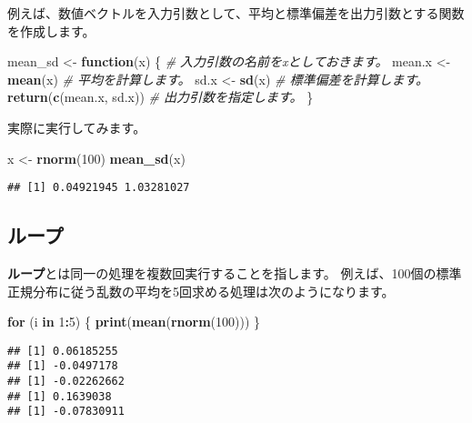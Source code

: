 \documentclass[]{bxjsarticle}
\newenvironment{Shaded}{\begin{snugshade}}{\end{snugshade}}
\newcommand{\CommentTok}[1]{\textcolor[rgb]{0.56,0.35,0.01}{\textit{#1}}}
\newcommand{\ControlFlowTok}[1]{\textcolor[rgb]{0.13,0.29,0.53}{\textbf{#1}}}
\newcommand{\DecValTok}[1]{\textcolor[rgb]{0.00,0.00,0.81}{#1}}
\newcommand{\KeywordTok}[1]{\textcolor[rgb]{0.13,0.29,0.53}{\textbf{#1}}}
\newcommand{\NormalTok}[1]{#1}
\newcommand{\OperatorTok}[1]{\textcolor[rgb]{0.81,0.36,0.00}{\textbf{#1}}}
\newcommand{\StringTok}[1]{\textcolor[rgb]{0.31,0.60,0.02}{#1}}
\begin{document}
例えば、数値ベクトルを入力引数として、平均と標準偏差を出力引数とする関数を作成します。

\begin{Shaded}
\begin{Highlighting}[]
\NormalTok{mean_sd <-}\StringTok{ }\ControlFlowTok{function}\NormalTok{(x) \{ }\CommentTok{# 入力引数の名前をxとしておきます。}
\NormalTok{  mean.x <-}\StringTok{ }\KeywordTok{mean}\NormalTok{(x) }\CommentTok{# 平均を計算します。}
\NormalTok{  sd.x <-}\StringTok{ }\KeywordTok{sd}\NormalTok{(x) }\CommentTok{# 標準偏差を計算します。}
  \KeywordTok{return}\NormalTok{(}\KeywordTok{c}\NormalTok{(mean.x, sd.x)) }\CommentTok{# 出力引数を指定します。}
\NormalTok{\}}
\end{Highlighting}
\end{Shaded}

実際に実行してみます。

\begin{Shaded}
\begin{Highlighting}[]
\NormalTok{x <-}\StringTok{ }\KeywordTok{rnorm}\NormalTok{(}\DecValTok{100}\NormalTok{)}
\KeywordTok{mean_sd}\NormalTok{(x)}
\end{Highlighting}
\end{Shaded}

\begin{verbatim}
## [1] 0.04921945 1.03281027
\end{verbatim}

\hypertarget{ux30ebux30fcux30d7}{%
\subsection{ループ}\label{ux30ebux30fcux30d7}}

\textbf{ループ}とは同一の処理を複数回実行することを指します。
例えば、100個の標準正規分布に従う乱数の平均を5回求める処理は次のようになります。

\begin{Shaded}
\begin{Highlighting}[]
\ControlFlowTok{for}\NormalTok{ (i }\ControlFlowTok{in} \DecValTok{1}\OperatorTok{:}\DecValTok{5}\NormalTok{) \{}
  \KeywordTok{print}\NormalTok{(}\KeywordTok{mean}\NormalTok{(}\KeywordTok{rnorm}\NormalTok{(}\DecValTok{100}\NormalTok{)))}
\NormalTok{\}}
\end{Highlighting}
\end{Shaded}

\begin{verbatim}
## [1] 0.06185255
## [1] -0.0497178
## [1] -0.02262662
## [1] 0.1639038
## [1] -0.07830911
\end{verbatim}
\end{document}
